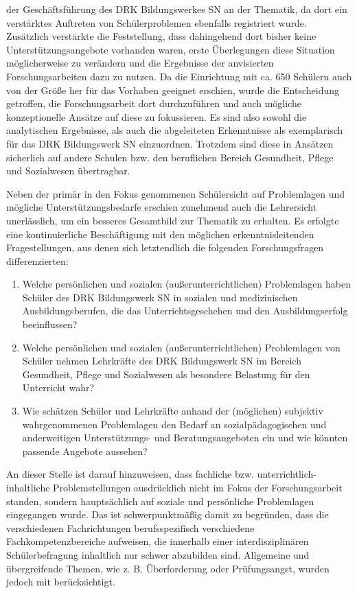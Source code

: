 der Geschäftsführung des DRK Bildungswerkes SN an der Thematik, da dort ein verstärktes Auftreten von Schülerproblemen ebenfalls registriert wurde. Zusätzlich verstärkte die Feststellung, dass dahingehend dort bisher keine Unterstützungsangebote vorhanden waren, erste Überlegungen diese Situation möglicherweise zu verändern und die Ergebnisse der anvisierten Forschungsarbeiten dazu zu nutzen. Da die Einrichtung mit ca. 650 Schülern auch von der Größe her für das Vorhaben geeignet erschien, wurde die Entscheidung getroffen, die Forschungsarbeit dort durchzuführen und auch mögliche konzeptionelle Ansätze auf diese zu fokussieren. Es sind also sowohl die analytischen Ergebnisse, als auch die abgeleiteten Erkenntnisse als exemplarisch für das DRK Bildungswerk SN einzuordnen. Trotzdem sind diese in Ansätzen sicherlich auf andere Schulen bzw. den beruflichen Bereich Gesundheit, Pflege und Sozialwesen übertragbar. 

Neben der primär in den Fokus genommenen Schülersicht auf Problemlagen und mögliche Unterstützungsbedarfe erschien zunehmend auch die Lehrersicht unerlässlich, um ein besseres Gesamtbild zur Thematik zu erhalten. Es erfolgte eine kontinuierliche Beschäftigung mit den möglichen erkenntnisleitenden Fragestellungen, aus denen sich letztendlich die folgenden Forschungsfragen differenzierten:

\begin{enumerate}
	\item Welche persönlichen und sozialen (außerunterrichtlichen) Problemlagen haben Schüler des DRK Bildungswerk SN in sozialen und medizinischen Ausbildungsberufen, die das Unterrichtsgeschehen und den Ausbildungserfolg beeinflussen?
	\item Welche persönlichen und sozialen (außerunterrichtlichen) Problemlagen von Schüler nehmen Lehrkräfte des DRK Bildungswerk SN im Bereich Gesundheit, Pflege und Sozialwesen als besondere Belastung für den Unterricht wahr?
	\item Wie schätzen Schüler und Lehrkräfte anhand der (möglichen) subjektiv wahrgenommenen Problemlagen den Bedarf an sozialpädagogischen und anderweitigen Unterstützungs- und Beratungsangeboten ein und wie könnten passende Angebote aussehen?
\end{enumerate}

\noindent
An dieser Stelle ist darauf hinzuweisen, dass fachliche bzw. unterrichtlich-inhaltliche Problemstellungen ausdrücklich nicht im Fokus der Forschungsarbeit standen, sondern hauptsächlich auf soziale und persönliche Problemlagen eingegangen wurde. Das ist schwerpunktmäßig damit zu begründen, dass die verschiedenen Fachrichtungen berufsspezifisch verschiedene Fachkompetenzbereiche aufweisen, die innerhalb einer interdisziplinären Schülerbefragung inhaltlich nur schwer abzubilden sind. Allgemeine und übergreifende Themen, wie z. B. Überforderung oder Prüfungsangst, wurden jedoch mit berücksichtigt.\\

